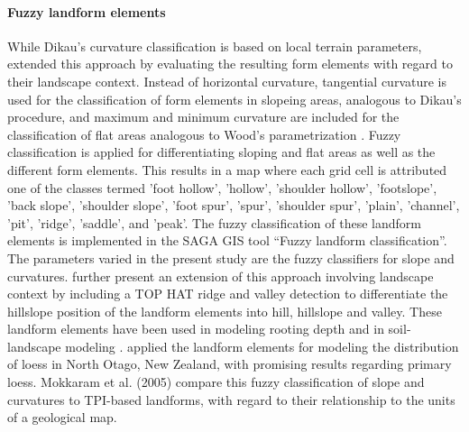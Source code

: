 \documentclass[preprint,12pt,authoryear]{elsarticle}
\begin{document}
\paragraph{Fuzzy landform elements \citep{Schmidt2004}}
While Dikau's curvature classification is based on local terrain parameters, \cite{Schmidt2004} extended this approach by evaluating the resulting form elements with regard to their landscape context.  Instead of horizontal curvature, tangential curvature is used for the classification of form elements in slopeing areas, analogous to Dikau's procedure, and maximum and minimum curvature are included for the classification of flat areas analogous to Wood's parametrization \citep{Wood1996}. Fuzzy classification is applied for differentiating sloping and flat areas as well as the different form elements. This results in a map where each grid cell is attributed one of the classes termed 'foot hollow', 'hollow', 'shoulder hollow', 'footslope', 'back slope', 'shoulder slope', 'foot spur', 'spur', 'shoulder spur', 'plain', 'channel', 'pit', 'ridge', 'saddle', and 'peak'.
 The fuzzy classification of these landform elements is implemented in the SAGA GIS tool “Fuzzy landform classification”. The parameters varied in the present study are the fuzzy classifiers for slope and curvatures. \cite{Schmidt2004} further present an extension of this approach involving landscape context by including a TOP HAT ridge and valley detection \citep{Rodriguez2002}  to differentiate the hillslope position of the landform elements into hill, hillslope and valley. These landform elements have been used in modeling rooting depth \citep{Schmidt2004} and in  soil-landscape modeling \citep{Schmidt2005}. \cite{Hughes2009} applied  the landform elements for modeling the distribution of loess in North Otago, New Zealand, with promising results regarding primary loess. Mokkaram et al. (2005) compare this fuzzy classification of slope and curvatures to TPI-based landforms, with regard to their relationship to the units of a geological map.
\end{document}
